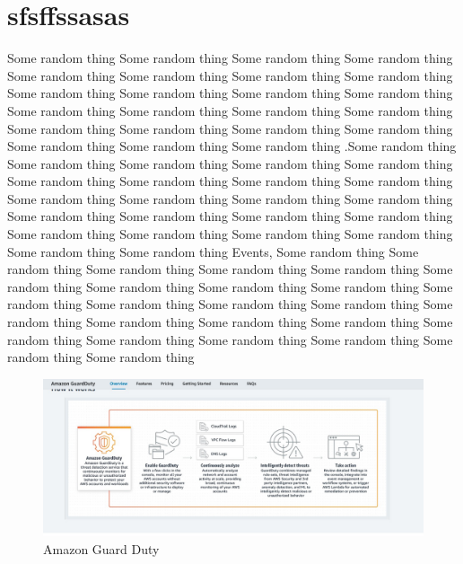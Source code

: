 \section{sfsffssasas}
Some random thing Some random thing Some random thing Some random thing Some random thing Some random thing Some random thing Some random thing Some random thing Some random thing Some random thing Some random thing Some random thing Some random thing Some random thing Some random thing Some random thing Some random thing Some random thing Some random thing Some random thing Some random thing Some random thing  \cite{amazon2}.Some random thing Some random thing Some random thing Some random thing Some random thing Some random thing Some random thing Some random thing Some random thing Some random thing Some random thing Some random thing Some random thing Some random thing Some random thing Some random thing Some random thing Some random thing Some random thing Some random thing Some random thing Some random thing Some random thing  
 Events\cite{cloudwatch}, Some random thing Some random thing Some random thing Some random thing Some random thing Some random thing Some random thing Some random thing Some random thing Some random thing Some random thing Some random thing Some random thing Some random thing Some random thing Some random thing Some random thing Some random thing Some random thing Some random thing Some random thing Some random thing Some random thing  

\begin{figure}[h]
	\begin{center}
 	\includegraphics[width=15cm]{texfiles/images/gd.jpg}
\caption{Amazon Guard Duty \protect\cite{AmazonGu40:online}}\label{fig:my_label}
	\end{center}
\end{figure}

